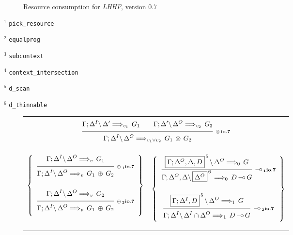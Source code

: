 \begin{figure}[t]
\begin{center}
    \caption{Resource consumption for {\em LHHF}, version 0.7}
    \label{fig:RC_VII1}
  \end{center}
\end{figure}

\bigskip

$^1$ {\tt pick\_resource}

$^2$ {\tt equalprog}

$^3$ {\tt subcontext}

$^4$ {\tt context\_intersection}

$^5$ {\tt d\_scan}

$^6$ {\tt d\_thinnable}




\clearpage
\begin{figure}[t]
  \begin{center}
    \leavevmode

    \begin{tabular}{|cc|}
      \hline &\\
      \multicolumn{2}{|c|}{
        $\ruleII
          {\ioVII{\G;\D^I}{\D'}{G_1}{v_1}}
          {\ioVII{\G;\D'}{\D^O}{G_2}{v_2}}
          {\ioVII{\G;\D^I}{\D^O}{G_1 \Times G_2}{v_1 \vee v_2}}
          {\Times io.7}$}
      \\&\\&\\

      $\left\{
        \begin{array}{c}
          \ruleI
            {\ioVII{\G;\D^I}{\D^O}{G_1}{v}}
            {\ioVII{\G;\D^I}{\D^O}{G_1 \Plus G_2}{v}}
            {\Plus_1 io.7}
        \\ \\
          \ruleI
            {\ioVII{\G;\D^I}{\D^O}{G_2}{v}}
            {\ioVII{\G;\D^I}{\D^O}{G_1 \Plus G_2}{v}}
            {\Plus_2 io.7}
        \end{array}
      \right\}$
      &
      $\left\{
        \begin{array}{c}
          \ruleI
            {\ioVII{\fb{\G;\D^O,\D,D}{5}}{\D^O}{G}{0}}
            {\ioVII{\G;\D^O,\D}{\fb{\D^O}{6}}{D \Lolli G}{0}}
            {\Lolli_1 io.7}
        \\ \\
          \ruleI
            {\ioVII{\fb{\G;\D^I,D}{5}}{\D^O}{G}{1}}
            {\ioVII{\G;\D^I}{\D^I \cap \D^O}{D \Lolli G}{1}}
            {\Lolli_2 io.7}
        \end{array}
      \right\}$
      \\&\\&\\


\end{tabular}
\end{center}
\end{figure}
